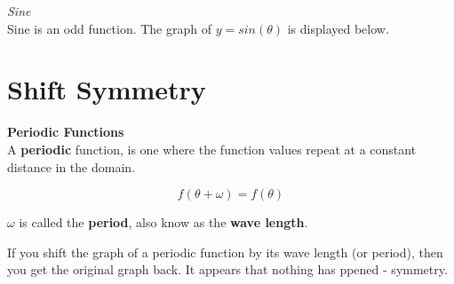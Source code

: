 \documentclass{ximera}
\begin{document}
\begin{example} \textit{Sine} \\

Sine is an odd function.  The graph of $y= sin(\theta)$ is displayed below. 

\begin{image}
\end{image}


\end{example}















\section{Shift Symmetry}


\begin{definition} \textbf{\textcolor{green!50!black}{Periodic Functions}} \\


A \textbf{periodic} function, is one where the function values repeat at a constant distance in the domain.



\[ f(\theta + \omega) = f(\theta) \]



$\omega$ is called the \textbf{period}, also know as the \textbf{wave length}. 



If you shift the graph of a periodic function by its wave length (or period), then you get the original graph back.  It appears that nothing has ppened - symmetry.

\end{definition}
\end{document}
